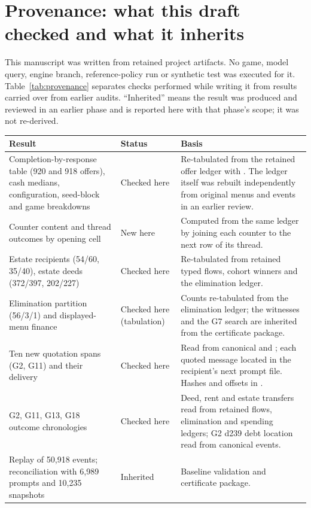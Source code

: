 \section{Provenance: what this draft checked and what it inherits}
\label{app:provenance}

This manuscript was written from retained project artifacts. No game, model query, engine branch, reference-policy run or synthetic test was executed for it. Table~\ref{tab:provenance} separates checks performed while writing it from results carried over from earlier audits. ``Inherited'' means the result was produced and reviewed in an earlier phase and is reported here with that phase's scope; it was not re-derived.

\begin{table}[htbp]
\centering\small
\begin{tabularx}{\linewidth}{@{}L{4.2cm}L{2.0cm}Y@{}}
\toprule
Result & Status & Basis\\
\midrule
Completion-by-response table (920 and 918 offers), cash medians, configuration, seed-block and game breakdowns & Checked here & Re-tabulated from the retained offer ledger with . The ledger itself was rebuilt independently from original menus and events in an earlier review.\\
Counter content and thread outcomes by opening cell & New here & Computed from the same ledger by joining each counter to the next row of its thread.\\
Estate recipients (54/60, 35/40), estate deeds (372/397, 202/227) & Checked here & Re-tabulated from retained typed flows, cohort winners and the elimination ledger.\\
Elimination partition (56/3/1) and displayed-menu finance & Checked here (tabulation) & Counts re-tabulated from the elimination ledger; the witnesses and the G7 search are inherited from the certificate package.\\
Ten new quotation spans (G2, G11) and their delivery & Checked here & Read from canonical  and ; each quoted message located in the recipient's next prompt file. Hashes and offsets in .\\
G2, G11, G13, G18 outcome chronologies & Checked here & Deed, rent and estate transfers read from retained flows, elimination and spending ledgers; G2 d239 debt location read from canonical events.\\
Replay of 50,918 events; reconciliation with 6,989 prompts and 10,235 snapshots & Inherited & Baseline validation and certificate package.\\

\end{tabularx}
\end{table}

